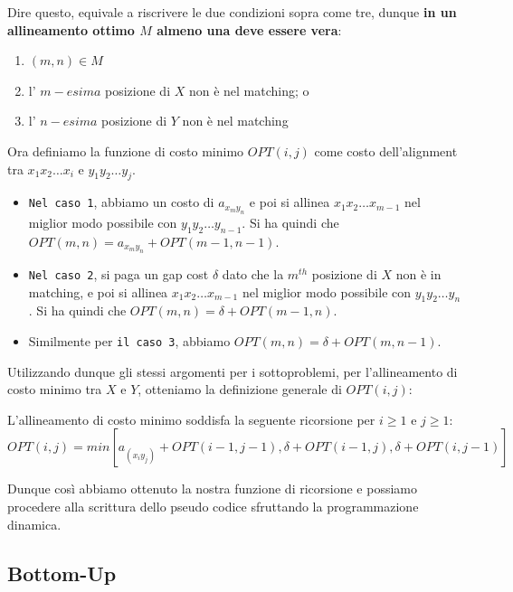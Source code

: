 Dire questo, equivale a riscrivere le due condizioni sopra come tre,
dunque \textbf{in un allineamento ottimo $M$ almeno una deve essere
  vera}:
\begin{enumerate}
  \item $(m,n) \in M$
  \item l' $m-esima$ posizione di $X$ non è nel matching; o
  \item l' $n-esima$ posizione di $Y$ non è nel matching
\end{enumerate}

Ora definiamo la funzione di costo minimo $OPT(i,j)$ come costo
dell'alignment tra $x_1 x_2 \ldots x_i$ e $y_1 y_2 \ldots y_j$.

\begin{itemize}
  \item
        \texttt{Nel\ caso\ 1}, abbiamo un costo di $a_{x_m y_n}$ e poi si
        allinea $x_1 x_2 \ldots x_{m-1}$ nel miglior modo possibile con
        $y_1 y_2 \ldots y_{n-1}$. Si ha quindi che
        $OPT(m,n) = a_{x_m y_n} + OPT(m-1,n-1)$.
  \item
        \texttt{Nel\ caso\ 2}, si paga un gap cost $\delta$ dato che la
        $m^{th}$ posizione di $X$ non è in matching, e poi si allinea
        $x_1 x_2 \ldots x_{m-1}$ nel miglior modo possibile con
        $y_1 y_2 \ldots y_{n}$. Si ha quindi che
        $OPT(m,n) = \delta + OPT(m-1,n)$.
  \item
        Similmente per \texttt{il\ caso\ 3}, abbiamo
        $OPT(m,n) = \delta + OPT(m,n-1)$.
\end{itemize}

Utilizzando dunque gli stessi argomenti per i sottoproblemi, per
l'allineamento di costo minimo tra $X$ e $Y$, otteniamo la
definizione generale di $OPT(i,j)$:

\begin{myblockquote}
  L'allineamento di costo minimo soddisfa la seguente ricorsione per
  $i \geq 1$ e $j \geq 1$:\\
  $OPT(i,j) = min[a_{(x_i y_j)} + OPT(i-1, j-1), \delta + OPT(i-1, j), \delta + OPT(i, j-1)]$
\end{myblockquote}

Dunque così abbiamo ottenuto la nostra funzione di ricorsione e possiamo
procedere alla scrittura dello pseudo codice sfruttando la
programmazione dinamica.

\subsection{Bottom-Up}

